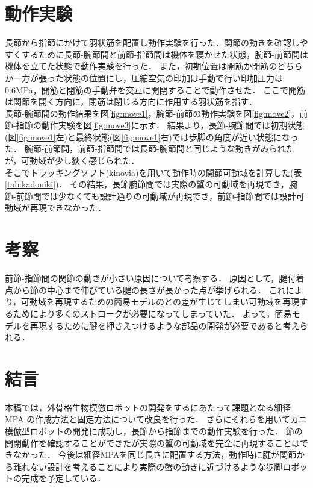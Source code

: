 \documentclass{jarticle}
\begin{document}
\section{動作実験}
長節から指節にかけて羽状筋を配置し動作実験を行った．関節の動きを確認しやすくするために長節-腕節間と前節-指節間は機体を寝かせた状態，腕節-前節間は機体を立てた状態で動作実験を行った．
また，初期位置は開筋か閉筋のどちらか一方が張った状態の位置にし，圧縮空気の印加は手動で行い印加圧力は0.6MPa，開筋と閉筋の手動弁を交互に開閉することで動作させた．
ここで開筋は関節を開く方向に，閉筋は閉じる方向に作用する羽状筋を指す．\\
長節-腕節間の動作結果を図\ref{fig:move1}，腕節-前節の動作実験を図\ref{fig:move2}，前節-指節の動作実験を図\ref{fig:move3}に示す．
結果より，長節-腕節間では初期状態(図\ref{fig:move1}左)と最終状態(図\ref{fig:move1}右)では歩脚の角度が近い状態になった．
腕節-前節間，前節-指節間では長節-腕節間と同じような動きがみられたが，可動域が少し狭く感じられた．\\
そこでトラッキングソフト(kinovia)を用いて動作時の関節可動域を計算した(表\ref{tab:kadouiki})．
その結果，長節腕節間では実際の蟹の可動域を再現でき，腕節-前節間では少なくても設計通りの可動域が再現でき，前節-指節間では設計可動域が再現できなかった．
\section{考察}
前節-指節間の関節の動きが小さい原因について考察する．
原因として，腱付着点から節の中心まで伸びている腱の長さが長かった点が挙げられる．
これにより，可動域を再現するための簡易モデルのとの差が生じてしまい可動域を再現するためにより多くのストロークが必要になってしまっていた．
よって，簡易モデルを再現するために腱を押さえつけるような部品の開発が必要であると考えられる．




\section{結言}
本稿では，外骨格生物模倣ロボットの開発をするにあたって課題となる細径MPA の作成方法と固定方法について改良を行った．
さらにそれらを用いてカニ模倣型ロボットの開発に成功し，長節から指節までの動作実験を行った．
節の開閉動作を確認することができたが実際の蟹の可動域を完全に再現することはできなかった．
今後は細径MPAを同じ長さに配置する方法，動作時に腱が関節から離れない設計を考えることにより実際の蟹の動きに近づけるような歩脚ロボットの完成を予定している．
\end{document}
